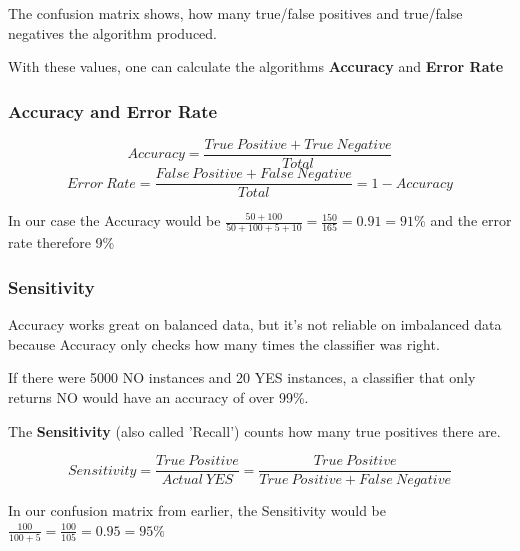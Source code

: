 \documentclass[11pt]{article}
\begin{document}
\vspace{10px}

The confusion matrix shows, how many true/false positives and true/false negatives the algorithm produced.

With these values, one can calculate the algorithms \textbf{Accuracy} and \textbf{Error Rate}

\subsubsection{Accuracy and Error Rate}

\begin{equation}
    Accuracy = \frac{True\ Positive + True\ Negative}{Total}
\end{equation}
\vspace{10px}
\begin{equation}
    Error\ Rate = \frac{False\ Positive + False\ Negative}{Total} = 1 - Accuracy
\end{equation}

\vspace{10px}

In our case the Accuracy would be $\frac{50+100}{50+100+5+10} = \frac{150}{165} = 0.91 = 91\%$ and the error rate therefore 9\%

\newpage

\subsubsection{Sensitivity}

Accuracy works great on balanced data, but it's not reliable on imbalanced data because Accuracy only checks how many times the classifier was right.

If there were 5000 NO instances and 20 YES instances, a classifier that only returns NO would have an accuracy of over 99\%.

\vspace{10px}

\noindent The \textbf{Sensitivity} (also called 'Recall') counts how many true positives there are.

\begin{equation}
    Sensitivity = \frac{True\ Positive}{Actual\ YES} = \frac{True\ Positive}{True\ Positive + False\ Negative}
\end{equation}

\vspace{10px}

In our confusion matrix from earlier, the Sensitivity would be $\frac{100}{100 + 5} = \frac{100}{105} = 0.95 = 95\%$
\end{document}
